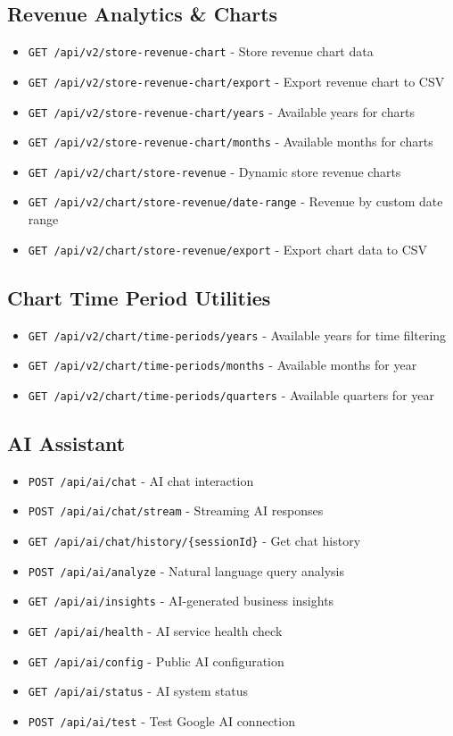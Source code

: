 \documentclass[11pt,a4paper]{article}
\begin{document}
\subsection{Revenue Analytics \& Charts}
\begin{itemize}[leftmargin=*]
    \item \texttt{GET /api/v2/store-revenue-chart} - Store revenue chart data
    \item \texttt{GET /api/v2/store-revenue-chart/export} - Export revenue chart to CSV
    \item \texttt{GET /api/v2/store-revenue-chart/years} - Available years for charts
    \item \texttt{GET /api/v2/store-revenue-chart/months} - Available months for charts
    \item \texttt{GET /api/v2/chart/store-revenue} - Dynamic store revenue charts
    \item \texttt{GET /api/v2/chart/store-revenue/date-range} - Revenue by custom date range
    \item \texttt{GET /api/v2/chart/store-revenue/export} - Export chart data to CSV
\end{itemize}

\subsection{Chart Time Period Utilities}
\begin{itemize}[leftmargin=*]
    \item \texttt{GET /api/v2/chart/time-periods/years} - Available years for time filtering
    \item \texttt{GET /api/v2/chart/time-periods/months} - Available months for year
    \item \texttt{GET /api/v2/chart/time-periods/quarters} - Available quarters for year
\end{itemize}

\subsection{AI Assistant}
\begin{itemize}[leftmargin=*]
    \item \texttt{POST /api/ai/chat} - AI chat interaction
    \item \texttt{POST /api/ai/chat/stream} - Streaming AI responses
    \item \texttt{GET /api/ai/chat/history/\{sessionId\}} - Get chat history
    \item \texttt{POST /api/ai/analyze} - Natural language query analysis
    \item \texttt{GET /api/ai/insights} - AI-generated business insights
    \item \texttt{GET /api/ai/health} - AI service health check
    \item \texttt{GET /api/ai/config} - Public AI configuration
    \item \texttt{GET /api/ai/status} - AI system status
    \item \texttt{POST /api/ai/test} - Test Google AI connection
\end{itemize}
\end{document}
